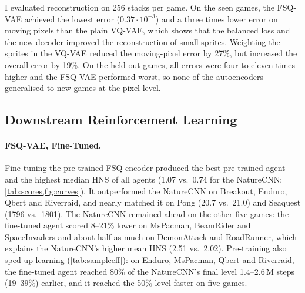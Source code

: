 \documentclass[runningheads]{llncs}
\begin{document}
I evaluated reconstruction on 256 stacks per game. On the seen games,
the FSQ-VAE achieved the lowest error ($0.37\cdot10^{-3}$) and a three times lower error on
moving pixels than the plain VQ-VAE, which shows that the balanced loss and the new decoder
improved the reconstruction of small sprites. Weighting the sprites in the VQ-VAE reduced the
moving-pixel error by 27\%, but increased the overall error by 19\%. On the held-out games, all
errors were four to eleven times higher and the FSQ-VAE performed worst, so none of the
autoencoders generalised to new games at the pixel level.

\FloatBarrier
\subsection{Downstream Reinforcement Learning}
\label{sec:rl}

\paragraph{FSQ-VAE, Fine-Tuned.} Fine-tuning the pre-trained FSQ encoder produced the best
pre-trained agent and the highest median HNS of all agents (1.07 vs.\ 0.74 for the NatureCNN;
\cref{tab:scores,fig:curves}). It outperformed the NatureCNN on Breakout, Enduro, Qbert and
Riverraid, and nearly matched it on Pong (20.7 vs.\ 21.0) and Seaquest (1796 vs.\ 1801). The
NatureCNN remained ahead on the other five games: the fine-tuned agent scored 8--21\% lower on
MsPacman, BeamRider and SpaceInvaders and about half as much on DemonAttack and RoadRunner,
which explains the NatureCNN's higher mean HNS (2.51 vs.\ 2.02). Pre-training also sped up learning (\cref{tab:sampleeff}): on
Enduro, MsPacman, Qbert and Riverraid, the fine-tuned agent reached 80\% of the NatureCNN's
final level 1.4--2.6\,M steps (19--39\%) earlier, and it reached the 50\% level faster on five
games.

\begin{table}[!htbp]
\centering
\caption{Mean episode return over the last 10\% of 10\,M training steps (single seed); best
per game in bold. $^\dagger$\,held-out games, not used for pre-training. Std-VAE and Res-VQ
scores, and NatureCNN and V-JEPA scores on the held-out games, are rounded as recorded. V-JEPA with the flattened feature; the pooled variant is in
\cref{tab:jepa-abl}.}
\label{tab:scores}
\footnotesize\setlength{\tabcolsep}{3pt}
\end{table}
\end{document}

